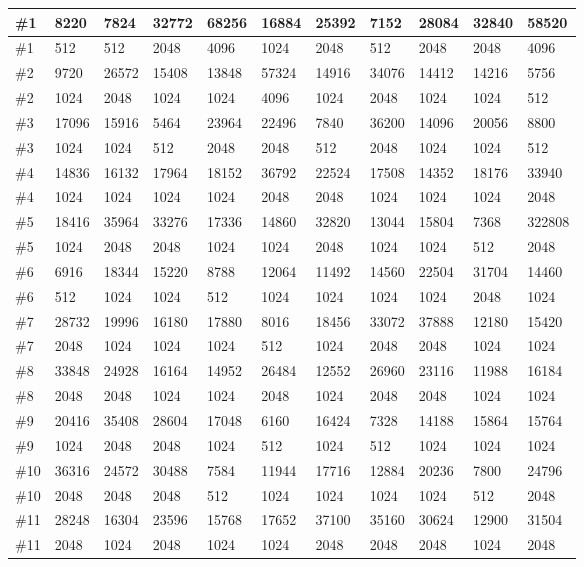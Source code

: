\begin{scriptsize}
\begin{center}
    \begin{tabular}{ | l | l | l | l | l | l | l | l | l | l | l | }
    \hline
    \#1 & 8220 & 7824 & 32772 & 68256 & 16884 & 25392 & 7152 & 28084 & 32840 & 58520 \\  \hline
    \#1 & 512 & 512 & 2048 & 4096 & 1024 & 2048 & 512 & 2048 & 2048 & 4096 \\ \hline \hline
    \#2 & 9720 & 26572 & 15408 & 13848 & 57324 & 14916 & 34076 & 14412 & 14216 & 5756 \\ \hline
    \#2 & 1024 & 2048 & 1024 & 1024 & 4096 & 1024 & 2048 & 1024 & 1024 & 512 \\ \hline
    \#3 & 17096 & 15916 & 5464 & 23964 & 22496 & 7840 & 36200 & 14096 & 20056 & 8800 \\ \hline
    \#3 & 1024 & 1024 & 512 & 2048 & 2048 & 512 & 2048 & 1024 & 1024 & 512 \\ \hline
    \#4 & 14836 & 16132 & 17964 & 18152 & 36792 & 22524 & 17508 & 14352 & 18176 & 33940 \\ \hline
    \#4 & 1024 & 1024 & 1024 & 1024 & 2048 & 2048 & 1024 & 1024 & 1024 & 2048 \\ \hline
    \#5 & 18416 & 35964 & 33276 & 17336 & 14860 & 32820 & 13044 & 15804 & 7368 & 322808 \\ \hline
    \#5 & 1024 & 2048 & 2048 & 1024 & 1024 & 2048 & 1024 & 1024 & 512 & 2048 \\ \hline
    \#6 & 6916 & 18344 & 15220 & 8788 & 12064 & 11492 & 14560 & 22504 & 31704 & 14460 \\ \hline
    \#6 & 512 & 1024 & 1024 & 512 & 1024 & 1024 & 1024 & 1024 & 2048 & 1024 \\ \hline
    \#7 & 28732 & 19996 & 16180 & 17880 & 8016 & 18456 & 33072 & 37888 & 12180 & 15420 \\ \hline
    \#7 & 2048 & 1024 & 1024 & 1024 & 512 & 1024 & 2048 & 2048 & 1024 & 1024 \\ \hline
    \#8 & 33848 & 24928 & 16164 & 14952 & 26484 & 12552 & 26960 & 23116 & 11988 & 16184 \\ \hline
    \#8 & 2048 & 2048 & 1024 & 1024 & 2048 & 1024 & 2048 & 2048 & 1024 & 1024 \\ \hline
    \#9 & 20416 & 35408 & 28604 & 17048 & 6160 & 16424 & 7328 & 14188 & 15864 & 15764 \\ \hline
    \#9 & 1024 & 2048 & 2048 & 1024 & 512 & 1024 & 512 & 1024 & 1024 & 1024 \\ \hline
    \#10 & 36316 & 24572 & 30488 & 7584 & 11944 & 17716 & 12884 & 20236 & 7800 & 24796 \\ \hline
    \#10 & 2048 & 2048 & 2048 & 512 & 1024 & 1024 & 1024 & 1024 & 512 & 2048 \\ \hline
    \#11 & 28248 & 16304 & 23596 & 15768 & 17652 & 37100 & 35160 & 30624 & 12900 & 31504 \\ \hline
    \#11 & 2048 & 1024 & 2048 & 1024 & 1024 & 2048 & 2048 & 2048 & 1024 & 2048 \\ \hline
    \end{tabular}
\end{center}
\end{scriptsize}
